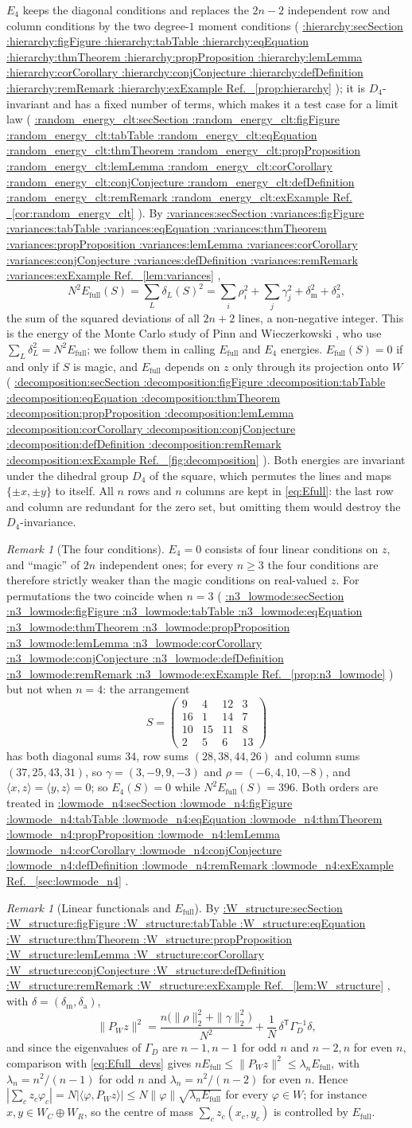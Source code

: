 \documentclass[11pt,a4paper]{article}
\makeatletter
\def\Cref@getprefix#1:#2\relax{#1}
\def\Cref@prefix@sec{sec}
\def\Cref@prefix@fig{fig}
\def\Cref@prefix@tab{tab}
\def\Cref@prefix@eq{eq}
\def\Cref@prefix@thm{thm}
\def\Cref@prefix@prop{prop}
\def\Cref@prefix@lem{lem}
\def\Cref@prefix@cor{cor}
\def\Cref@prefix@conj{conj}
\def\Cref@prefix@def{def}
\def\Cref@prefix@rem{rem}
\def\Cref@prefix@ex{ex}
\def\Cref@type@cap#1{%
  \edef\Cref@tmp{#1}%
  \ifx\Cref@tmp\Cref@prefix@sec Section%
  \else\ifx\Cref@tmp\Cref@prefix@fig Figure%
  \else\ifx\Cref@tmp\Cref@prefix@tab Table%
  \else\ifx\Cref@tmp\Cref@prefix@eq Equation%
  \else\ifx\Cref@tmp\Cref@prefix@thm Theorem%
  \else\ifx\Cref@tmp\Cref@prefix@prop Proposition%
  \else\ifx\Cref@tmp\Cref@prefix@lem Lemma%
  \else\ifx\Cref@tmp\Cref@prefix@cor Corollary%
  \else\ifx\Cref@tmp\Cref@prefix@conj Conjecture%
  \else\ifx\Cref@tmp\Cref@prefix@def Definition%
  \else\ifx\Cref@tmp\Cref@prefix@rem Remark%
  \else\ifx\Cref@tmp\Cref@prefix@ex Example%
  \else Ref.%
  \fi\fi\fi\fi\fi\fi\fi\fi\fi\fi\fi\fi
}
\DeclareRobustCommand{\Cref}[1]{%
  \begingroup
  \edef\Cref@label{#1}%
  \edef\Cref@prefix{\expandafter\Cref@getprefix\Cref@label:\relax}%
  \hyperref[#1]{\Cref@type@cap{\Cref@prefix}~\ref*{#1}}%
  \endgroup
}
\theoremstyle{plain}
\theoremstyle{definition}
\theoremstyle{remark}
\newtheorem{remark}[theorem]{Remark}
\newcommand{\Efull}{E_{\mathrm{full}}}
\newcommand{\Efour}{E_4}
\makeatother
\begin{document}
$\Efour$ keeps the diagonal conditions and replaces the $2n-2$ independent row and column conditions by the two degree-$1$ moment conditions (\Cref{prop:hierarchy}); it is $D_4$-invariant and has a fixed number of terms, which makes it a test case for a limit law (\Cref{cor:random_energy_clt}).
By \Cref{lem:variances},
\begin{equation}
N^{2}\Efull(S)=\sum_{L}\delta_L(S)^{2}=\sum_i\rho_i^{2}+\sum_j\gamma_j^{2}+\delta_{\mathrm m}^{2}+\delta_{\mathrm a}^{2},
\label{eq:Efull_devs}
\end{equation}
the sum of the squared deviations of all $2n+2$ lines, a non-negative integer.
This is the energy of the Monte Carlo study of Pinn and Wieczerkowski \cite{pinn1998number}, who use $\sum_L\delta_L^2=N^2\Efull$; we follow them in calling $\Efull$ and $\Efour$ energies.
$\Efull(S)=0$ if and only if $S$ is magic, and $\Efull$ depends on $z$ only through its projection onto $W$ (\Cref{fig:decomposition}).
Both energies are invariant under the dihedral group $D_4$ of the square, which permutes the lines and maps $\{\pm x,\pm y\}$ to itself.
All $n$ rows and $n$ columns are kept in \eqref{eq:Efull}: the last row and column are redundant for the zero set, but omitting them would destroy the $D_4$-invariance.

\begin{remark}[The four conditions]
\label{rem:four_term_insufficient}
$\Efour=0$ consists of four linear conditions on $z$, and ``magic'' of $2n$ independent ones; for every $n\ge3$ the four conditions are therefore strictly weaker than the magic conditions on real-valued $z$.
For permutations the two coincide when $n=3$ (\Cref{prop:n3_lowmode}) but not when $n=4$: the arrangement
\[
S=\begin{pmatrix}9&4&12&3\\16&1&14&7\\10&15&11&8\\2&5&6&13\end{pmatrix}
\]
has both diagonal sums $34$, row sums $(28,38,44,26)$ and column sums $(37,25,43,31)$, so $\gamma=(3,-9,9,-3)$ and $\rho=(-6,4,10,-8)$, and $\langle x,z\rangle=\langle y,z\rangle=0$; so $\Efour(S)=0$ while $N^2\Efull(S)=396$.
Both orders are treated in \Cref{sec:lowmode_n4}.
\end{remark}

\begin{remark}[Linear functionals and $\Efull$]
\label{rem:quant_balance}
By \Cref{lem:W_structure}, with $\delta=(\delta_{\mathrm m},\delta_{\mathrm a})$,
\[
\|P_Wz\|^2=\frac{n\bigl(\|\rho\|_2^2+\|\gamma\|_2^2\bigr)}{N^2}+\frac1N\,\delta^{\mathsf T}\Gamma_D^{-1}\delta ,
\]
and since the eigenvalues of $\Gamma_D$ are $n-1,n-1$ for odd $n$ and $n-2,n$ for even $n$, comparison with \eqref{eq:Efull_devs} gives $n\Efull\le\|P_Wz\|^2\le\lambda_n\Efull$, with $\lambda_n=n^2/(n-1)$ for odd $n$ and $\lambda_n=n^2/(n-2)$ for even $n$.
Hence $|\sum_cz_c\varphi_c|=N|\langle\varphi,P_Wz\rangle|\le N\|\varphi\|\sqrt{\lambda_n\Efull}$ for every $\varphi\in W$; for instance $x,y\in W_C\oplus W_R$, so the centre of mass $\sum_cz_c(x_c,y_c)$ is controlled by $\Efull$.
\end{remark}
\end{document}
